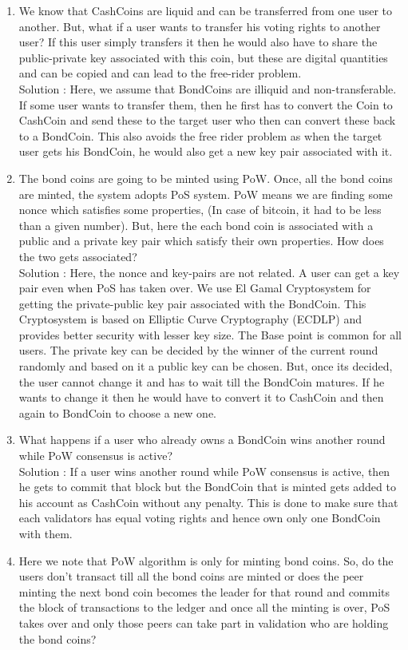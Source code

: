 \begin{enumerate}
    \item We know that CashCoins are liquid and can be transferred from one user to another. But, what if a user wants to transfer his voting rights to another user? If this user simply transfers it then he would also have to share the public-private key associated with this coin, but these are digital quantities and can be copied and can lead to the free-rider problem.\\
    Solution : Here, we assume that BondCoins are illiquid and non-transferable. If some user wants to transfer them, then he first has to convert the Coin to CashCoin and send these to the target user who then can convert these back to a BondCoin. This also avoids the free rider problem as when the target user gets his BondCoin, he would also get a new key pair associated with it.
    \item The bond coins are going to be minted using PoW. Once, all the bond coins are minted, the system adopts PoS system. PoW means we are finding some nonce which satisfies some properties, (In case of bitcoin, it had to be less than a given number). But, here the each bond coin is associated with a public and a private key pair which satisfy their own properties. How does the two gets associated?\\
    Solution : Here, the nonce and key-pairs are not related. A user can get a key pair even when PoS has taken over. We use El Gamal Cryptosystem for getting the private-public key pair associated with the BondCoin. This Cryptosystem is based on Elliptic Curve Cryptography (ECDLP) and provides better security with lesser key size. The Base point is common for all users. The private key can be decided by the winner of the current round randomly and based on it a public key can be chosen. But, once its decided, the user cannot change it and has to wait till the BondCoin matures. If he wants to change it then he would have to convert it to CashCoin and then again to BondCoin to choose a new one.
    \item What happens if a user who already owns a BondCoin wins another round while PoW consensus is active?\\
    Solution : If a user wins another round while PoW consensus is active, then he gets to commit that block but the BondCoin that is minted gets added to his account as CashCoin without any penalty. This is done to make sure that each validators has equal voting rights and hence own only one BondCoin with them.
    \item Here we note that PoW algorithm is only for minting bond coins. So, do the users don’t transact till all the bond coins are minted or does the peer minting the next bond coin becomes the leader for that round and commits the block of transactions to the ledger and once all the minting is over, PoS takes over and only those peers can take part in validation who are holding the bond coins?\\

\end{enumerate}
